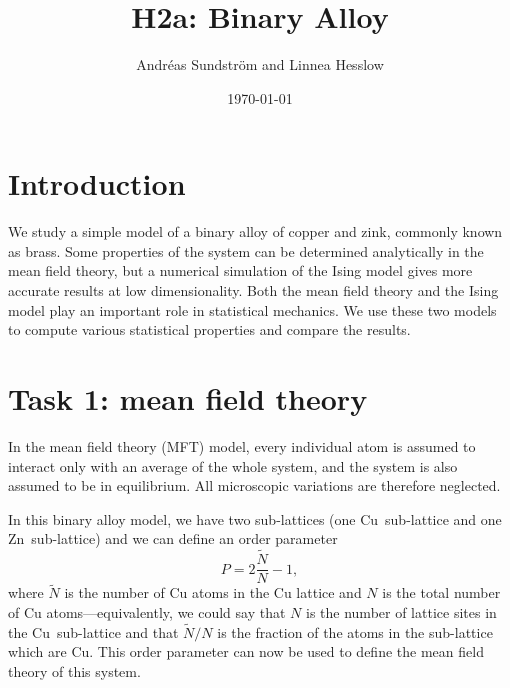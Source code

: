 
\usepackage{units}
\usepackage{physics}

\newcommand{\ee}{\mathrm{e}}
\newcommand{\ii}{\mathrm{i}}
\newcommand{\kB}{k_\mathrm{B}}
\newcommand{\MFT}{\text{MFT}}

\title{H2a: Binary Alloy}
\author{Andr\'eas Sundstr\"om and Linnea Hesslow}
\date{\today}





\section*{Introduction}
We study a simple model of a binary alloy of copper and zink, commonly known as brass. Some properties of the system can be determined analytically in the mean field theory, but a numerical simulation of the Ising model gives more accurate results at low dimensionality. Both the mean field theory and the Ising model play an important role in statistical mechanics. We use these two models to compute various statistical properties and compare the results. 

\section*{Task 1: mean field theory}
In the mean field theory (MFT) model, every individual atom is assumed
to interact only with an average of the whole system, and the system
is also assumed to be in equilibrium. All microscopic
variations are therefore neglected.

In this binary alloy model, we have two sub-lattices (one
Cu~sub-lattice and one Zn~sub-lattice) and we can define an order
parameter
\begin{equation}
P=2\frac{\tilde{N}}{N}-1,
\end{equation}
where $\tilde{N}$ is the number of Cu atoms in the Cu lattice and $N$
is the total number of Cu atoms---equivalently, we could say that $N$
is the number of lattice sites in the Cu~sub-lattice and that
$\tilde{N}/N$ is the fraction of the atoms in the sub-lattice which
are Cu. This order parameter can now be used to define the mean field
theory of this system.

